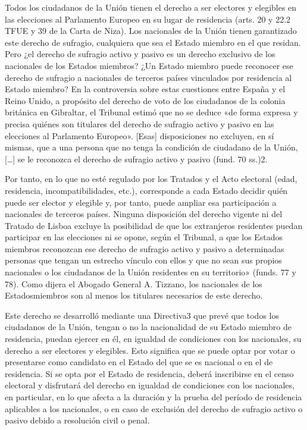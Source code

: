 \documentclass[10pt,a4paper]{article}
\begin{document}
Todos los ciudadanos de la Unión tienen el derecho a ser electores y elegibles en las elecciones al Parlamento Europeo en su lugar de residencia (arts. 20 y 22.2 TFUE y 39 de la Carta de Niza). Los nacionales de la Unión tienen garantizado este derecho de sufragio, cualquiera que sea el Estado miembro en el que residan. Pero ¿el derecho de sufragio activo y pasivo es un derecho exclusivo de los nacionales de los Estados miembros? ¿Un Estado miembro puede reconocer ese derecho de sufragio a nacionales de terceros países vinculados por residencia al Estado miembro? En la controversia sobre estas cuestiones entre España y el Reino Unido, a propósito del derecho de voto de los ciudadanos de la colonia británica en Gibraltar, el Tribunal estimó que no se deduce «de forma expresa y precisa quiénes son titulares del derecho de sufragio activo y pasivo en las elecciones al Parlamento Europeo». [Esas] disposiciones no excluyen, en sí mismas, que a una persona que no tenga la condición de ciudadano de la Unión, […] se le reconozca el derecho de sufragio activo y pasivo (fund. 70 ss.)2.

Por tanto, en lo que no esté regulado por los Tratados y el Acto electoral (edad, residencia, incompatibilidades, etc.), corresponde a cada Estado decidir quién puede ser elector y elegible y, por tanto, puede ampliar esa participación a nacionales de terceros países. Ninguna disposición del derecho vigente ni del Tratado de Lisboa excluye la posibilidad de que los extranjeros residentes puedan participar en las elecciones ni se opone, según el Tribunal, a que los Estados miembros reconozcan ese derecho de sufragio activo y pasivo a determinadas personas que tengan un estrecho vínculo con ellos y que no sean sus propios nacionales o los ciudadanos de la Unión residentes en su territorio» (funds. 77 y 78). Como dijera el Abogado General A. Tizzano, los nacionales de los Estadosmiembros son al menos los titulares necesarios de este derecho.

Este derecho se desarrolló mediante una Directiva3 que prevé que todos los ciudadanos de la Unión, tengan o no la nacionalidad de su Estado miembro de residencia, puedan ejercer en él, en igualdad de condiciones con los nacionales, su derecho a ser electores y elegibles. Esto significa que se puede optar por votar o presentarse como candidato en el Estado del que se es nacional o en el de residencia. Si se opta por el Estado de residencia, deberá inscribirse en el censo electoral y disfrutará del derecho en igualdad de condiciones con los nacionales, en particular, en lo que afecta a la duración y la prueba del período de residencia aplicables a los nacionales, o en caso de exclusión del derecho de sufragio activo o pasivo debido a resolución civil o penal.
\end{document}
